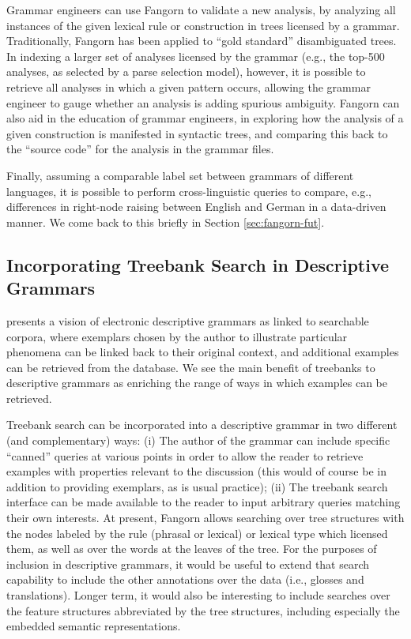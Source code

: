 Grammar engineers can use Fangorn to validate a new analysis, by
analyzing all instances of the given lexical rule or construction in
trees licensed by a grammar. Traditionally, Fangorn has been
applied to ``gold standard'' disambiguated trees. In indexing a larger
set of analyses licensed by the grammar (e.g., the top-500 analyses, as
selected by a parse selection model), however, it is possible to
retrieve all analyses in which a given pattern occurs, allowing the
grammar engineer to gauge whether an analysis is
adding spurious ambiguity. Fangorn can also aid in the education of grammar
engineers, in exploring how the analysis of a given construction is
manifested in syntactic trees, and comparing this back to the ``source
code'' for the analysis in the grammar files.

Finally, assuming a comparable label set between grammars of different
languages, it is possible to perform cross-linguistic queries to
compare, e.g., differences in right-node raising between English and
German in a data-driven manner. We come back to this briefly in Section \ref{sec:fangorn-fut}.



\subsection{Incorporating Treebank Search in Descriptive Grammars}

 presents a vision of electronic descriptive
grammars as linked to searchable corpora, where exemplars chosen
by the author to illustrate particular phenomena can be linked
back to their original context, and additional examples can
be retrieved from the database.  We see the main benefit of treebanks
to descriptive grammars as enriching the range of ways in which 
examples can be retrieved.  

Treebank search can be incorporated into a descriptive grammar
in two different (and complementary) ways:  (i) The author of the grammar
can include specific ``canned'' queries at various points in order to allow
the reader to retrieve examples with properties relevant to
the discussion  (this would of course be in addition to providing
exemplars, as is usual practice); (ii) The treebank search interface
can be made available to the reader to input arbitrary queries
matching their own interests.  At present, Fangorn allows searching
over tree structures with the nodes labeled by the rule (phrasal or lexical)
or lexical type which licensed them, as well as over the words at
the leaves of the tree.  
For the purposes of inclusion in descriptive grammars, it would be
useful to extend that search capability to include the other
annotations over the data (i.e., glosses and translations).  Longer
term, it would also be interesting to include searches over the
feature structures abbreviated by the tree structures, including
especially the embedded semantic representations.

